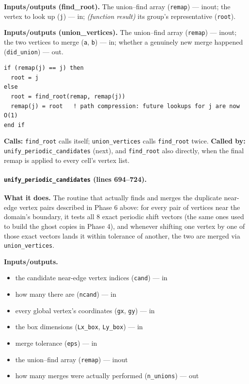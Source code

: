 \documentclass[11pt]{article}
\begin{document}
\textbf{Inputs/outputs (find\_root).} The union--find array (\texttt{remap}) --- inout;
the vertex to look up (\texttt{j}) --- in; \emph{(function result)} its group's
representative (\texttt{root}).

\textbf{Inputs/outputs (union\_vertices).} The union--find array (\texttt{remap}) ---
inout; the two vertices to merge (\texttt{a}, \texttt{b}) --- in; whether a genuinely
new merge happened (\texttt{did\_union}) --- out.

\begin{lstlisting}[caption={Path-compressing root lookup, the core of \texttt{find\_root}.}]
if (remap(j) == j) then
  root = j
else
  root = find_root(remap, remap(j))
  remap(j) = root   ! path compression: future lookups for j are now O(1)
end if
\end{lstlisting}

\textbf{Calls:} \texttt{find\_root} calls itself; \texttt{union\_vertices} calls
\texttt{find\_root} twice. \textbf{Called by:} \texttt{unify\_periodic\_candidates}
(next), and \texttt{find\_root} also directly, when the final remap is applied to every
cell's vertex list.

\paragraph{\texttt{unify\_periodic\_candidates} (lines 694--724).}
\textbf{What it does.} The routine that actually finds and merges the duplicate
near-edge vertex pairs described in Phase 6 above: for every pair of vertices near the
domain's boundary, it tests all 8 exact periodic shift vectors (the same ones used to
build the ghost copies in Phase 4), and whenever shifting one vertex by one of those
exact vectors lands it within tolerance of another, the two are merged via
\texttt{union\_vertices}.

\textbf{Inputs/outputs.}
\begin{itemize}[nosep]
  \item the candidate near-edge vertex indices (\texttt{cand}) --- in
  \item how many there are (\texttt{ncand}) --- in
  \item every global vertex's coordinates (\texttt{gx}, \texttt{gy}) --- in
  \item the box dimensions (\texttt{Lx\_box}, \texttt{Ly\_box}) --- in
  \item merge tolerance (\texttt{eps}) --- in
  \item the union--find array (\texttt{remap}) --- inout
  \item how many merges were actually performed (\texttt{n\_unions}) --- out
\end{itemize}
\end{document}
